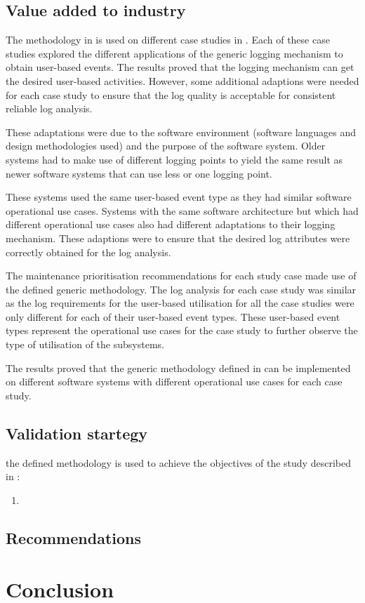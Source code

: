 \subsection{Value added to industry}
The methodology in  is used on different case studies in . Each of these case studies explored the different applications of the generic logging mechanism to obtain user-based events. The results proved that the logging mechanism can get the desired user-based activities. However, some additional adaptions were needed for each case study to ensure that the log quality is acceptable for consistent reliable log analysis.\par These adaptations were due to the software environment (software languages and design methodologies used) and the purpose of the software system. Older systems had to make use of different logging points to yield the same result as newer software systems that can use less or one logging point.\par These systems used the same user-based event type as they had similar software operational use cases. Systems with the same software architecture but which had different operational use cases also had different adaptations to their logging mechanism. These adaptions were to ensure that the desired log attributes were correctly obtained for the log analysis. \par The maintenance prioritisation recommendations for each study case made use of the defined generic methodology. The log analysis for each case study was similar as the log requirements for the user-based utilisation for all the case studies were only different for each of their user-based event types. These user-based event types represent the operational use cases for the case study to further observe the type of utilisation of the subsystems. \par The results proved that the generic methodology defined in  can be implemented on different software systems with different operational use cases for each case study. 

\subsection{Validation startegy}
 the defined methodology is used to achieve the objectives of the study described in :

\begin{enumerate}
	\item 
\end{enumerate}

\subsection{Recommendations}

\section{Conclusion}
